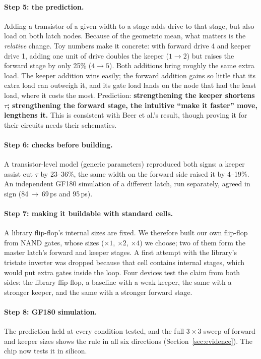 \documentclass[11pt]{article}
\begin{document}
\paragraph{Step 5: the prediction.} Adding a transistor of a given width to a stage adds drive to that stage, but also
load on both latch nodes. Because of the geometric mean, what matters is the \emph{relative} change. Toy numbers make it
concrete: with forward drive 4 and keeper drive 1, adding one unit of drive doubles the keeper ($1\to2$) but raises the
forward stage by only 25\% ($4\to5$). Both additions bring roughly the same extra load. The keeper addition wins easily;
the forward addition gains so little that its extra load can outweigh it, and its gate load lands on the node that had
the least load, where it costs the most. Prediction: \textbf{strengthening the keeper shortens $\tau$; strengthening the
forward stage, the intuitive ``make it faster'' move, lengthens it.} This is consistent with Beer et al.'s result, though
proving it for their circuits needs their schematics.

\paragraph{Step 6: checks before building.} A transistor-level model (generic parameters) reproduced both signs: a
keeper assist cut $\tau$ by 23--36\%, the same width on the forward side raised it by 4--19\%. An independent GF180
simulation of a different latch, run separately, agreed in sign (84\,$\to$\,69\,ps and 95\,ps).

\paragraph{Step 7: making it buildable with standard cells.} A library flip-flop's internal sizes are fixed. We therefore
built our own flip-flop from NAND gates, whose sizes ($\times1$, $\times2$, $\times4$) we choose; two of them form the
master latch's forward and keeper stages. A first attempt with the library's tristate inverter was dropped because that
cell contains internal stages, which would put extra gates inside the loop. Four devices test the claim from both sides:
the library flip-flop, a baseline with a weak keeper, the same with a stronger keeper, and the same with a stronger
forward stage.

\paragraph{Step 8: GF180 simulation.} The prediction held at every condition tested, and the full $3\times3$ sweep of
forward and keeper sizes shows the rule in all six directions (Section~\ref{sec:evidence}). The chip now tests it in
silicon.
\end{document}
